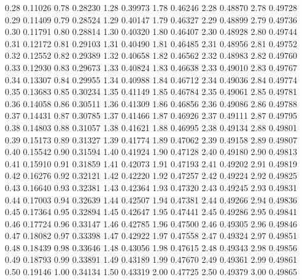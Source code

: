 \documentclass[onecolumn,11pt]{book}
\begin{document}
\begin{Schunk}
\begin{Soutput}
 0.28 0.11026 0.78 0.28230 1.28 0.39973 1.78 0.46246 2.28 0.48870 2.78 0.49728
 0.29 0.11409 0.79 0.28524 1.29 0.40147 1.79 0.46327 2.29 0.48899 2.79 0.49736
 0.30 0.11791 0.80 0.28814 1.30 0.40320 1.80 0.46407 2.30 0.48928 2.80 0.49744
 0.31 0.12172 0.81 0.29103 1.31 0.40490 1.81 0.46485 2.31 0.48956 2.81 0.49752
 0.32 0.12552 0.82 0.29389 1.32 0.40658 1.82 0.46562 2.32 0.48983 2.82 0.49760
 0.33 0.12930 0.83 0.29673 1.33 0.40824 1.83 0.46638 2.33 0.49010 2.83 0.49767
 0.34 0.13307 0.84 0.29955 1.34 0.40988 1.84 0.46712 2.34 0.49036 2.84 0.49774
 0.35 0.13683 0.85 0.30234 1.35 0.41149 1.85 0.46784 2.35 0.49061 2.85 0.49781
 0.36 0.14058 0.86 0.30511 1.36 0.41309 1.86 0.46856 2.36 0.49086 2.86 0.49788
 0.37 0.14431 0.87 0.30785 1.37 0.41466 1.87 0.46926 2.37 0.49111 2.87 0.49795
 0.38 0.14803 0.88 0.31057 1.38 0.41621 1.88 0.46995 2.38 0.49134 2.88 0.49801
 0.39 0.15173 0.89 0.31327 1.39 0.41774 1.89 0.47062 2.39 0.49158 2.89 0.49807
 0.40 0.15542 0.90 0.31594 1.40 0.41924 1.90 0.47128 2.40 0.49180 2.90 0.49813
 0.41 0.15910 0.91 0.31859 1.41 0.42073 1.91 0.47193 2.41 0.49202 2.91 0.49819
 0.42 0.16276 0.92 0.32121 1.42 0.42220 1.92 0.47257 2.42 0.49224 2.92 0.49825
 0.43 0.16640 0.93 0.32381 1.43 0.42364 1.93 0.47320 2.43 0.49245 2.93 0.49831
 0.44 0.17003 0.94 0.32639 1.44 0.42507 1.94 0.47381 2.44 0.49266 2.94 0.49836
 0.45 0.17364 0.95 0.32894 1.45 0.42647 1.95 0.47441 2.45 0.49286 2.95 0.49841
 0.46 0.17724 0.96 0.33147 1.46 0.42785 1.96 0.47500 2.46 0.49305 2.96 0.49846
 0.47 0.18082 0.97 0.33398 1.47 0.42922 1.97 0.47558 2.47 0.49324 2.97 0.49851
 0.48 0.18439 0.98 0.33646 1.48 0.43056 1.98 0.47615 2.48 0.49343 2.98 0.49856
 0.49 0.18793 0.99 0.33891 1.49 0.43189 1.99 0.47670 2.49 0.49361 2.99 0.49861
 0.50 0.19146 1.00 0.34134 1.50 0.43319 2.00 0.47725 2.50 0.49379 3.00 0.49865
\end{Soutput}
\end{Schunk}
\vfill\eject
\end{document}
